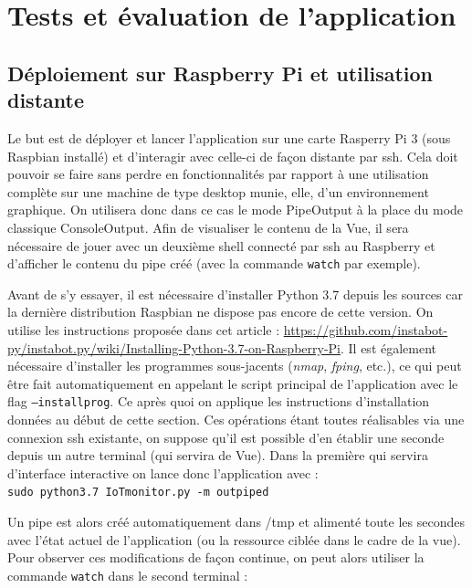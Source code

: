 \documentclass[]{article}
\begin{document}
\newpage


\section{Tests et évaluation de l'application}

\subsection{Déploiement sur Raspberry Pi et utilisation distante}

Le but est de déployer et lancer l'application sur une carte Rasperry Pi 3 (sous Raspbian installé) et d'interagir avec celle-ci de façon distante par ssh. Cela doit pouvoir se faire sans perdre en fonctionnalités par rapport à une utilisation complète sur une machine de type desktop munie, elle, d'un environnement graphique. On utilisera donc dans ce cas le mode PipeOutput à la place du mode classique ConsoleOutput. Afin de visualiser le contenu de la Vue, il sera nécessaire de jouer avec un deuxième shell connecté par ssh au Raspberry et d'afficher le contenu du pipe créé (avec la commande \texttt{watch} par exemple).\\

\par Avant de s'y essayer, il est nécessaire d'installer Python 3.7 depuis les sources car la dernière distribution Raspbian ne dispose pas encore de cette version. On utilise les instructions proposée dans cet article : \url{https://github.com/instabot-py/instabot.py/wiki/Installing-Python-3.7-on-Raspberry-Pi}. Il est également nécessaire d'installer les programmes sous-jacents (\textit{nmap}, \textit{fping}, etc.), ce qui peut être fait automatiquement en appelant le script principal de l'application avec le flag \texttt{--installprog}. Ce après quoi on applique les instructions d'installation données au début de cette section. Ces opérations étant toutes réalisables via une connexion ssh existante, on suppose qu'il est possible d'en établir une seconde depuis un autre terminal (qui servira de Vue). Dans la première qui servira d'interface interactive on lance donc l'application avec :~\\

\indent \texttt{sudo python3.7 IoTmonitor.py -m outpiped}
\vspace{0.4cm}
\par Un pipe est alors créé automatiquement dans /tmp et alimenté toute les secondes avec l'état actuel de l'application (ou la ressource ciblée dans le cadre de la vue). Pour observer ces modifications de façon continue, on peut alors utiliser la commande \texttt{watch} dans le second terminal :~\\
\end{document}
